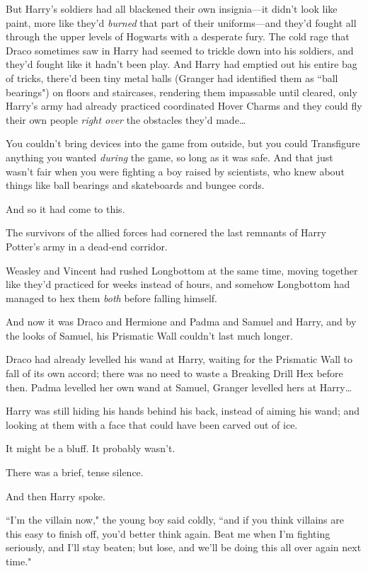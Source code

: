 But Harry's soldiers had all blackened their own insignia---it didn't look like paint, more like they'd \emph{burned} that part of their uniforms---and they'd fought all through the upper levels of Hogwarts with a desperate fury. The cold rage that Draco sometimes saw in Harry had seemed to trickle down into his soldiers, and they'd fought like it hadn't been play. And Harry had emptied out his entire bag of tricks, there'd been tiny metal balls (Granger had identified them as ``ball bearings") on floors and staircases, rendering them impassable until cleared, only Harry's army had already practiced coordinated Hover Charms and they could fly their own people \emph{right over} the obstacles they'd made{\ldots}

You couldn't bring devices into the game from outside, but you could Transfigure anything you wanted \emph{during} the game, so long as it was safe. And that just wasn't fair when you were fighting a boy raised by scientists, who knew about things like ball bearings and skateboards and bungee cords.

And so it had come to this.

The survivors of the allied forces had cornered the last remnants of Harry Potter's army in a dead-end corridor.

Weasley and Vincent had rushed Longbottom at the same time, moving together like they'd practiced for weeks instead of hours, and somehow Longbottom had managed to hex them \emph{both} before falling himself.

And now it was Draco and Hermione and Padma and Samuel and Harry, and by the looks of Samuel, his Prismatic Wall couldn't last much longer.

Draco had already levelled his wand at Harry, waiting for the Prismatic Wall to fall of its own accord; there was no need to waste a Breaking Drill Hex before then. Padma levelled her own wand at Samuel, Granger levelled hers at Harry{\ldots}

Harry was still hiding his hands behind his back, instead of aiming his wand; and looking at them with a face that could have been carved out of ice.

It might be a bluff. It probably wasn't.

There was a brief, tense silence.

And then Harry spoke.

``I'm the villain now," the young boy said coldly, ``and if you think villains are this easy to finish off, you'd better think again. Beat me when I'm fighting seriously, and I'll stay beaten; but lose, and we'll be doing this all over again next time."

